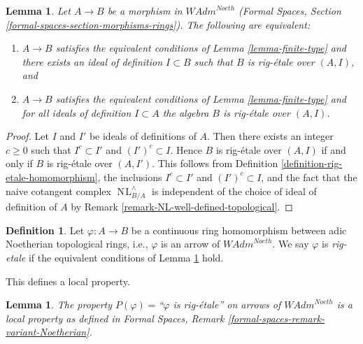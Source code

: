 \documentclass{stacks-project}
\theoremstyle{plain}
\newtheorem{lemma}[subsection]{Lemma}
\theoremstyle{definition}
\newtheorem{definition}[subsection]{Definition}
\theoremstyle{remark}
\numberwithin{equation}{subsection}
\def\NL{\mathop{N\!L}\nolimits}
\begin{document}
\begin{lemma}
\label{lemma-rig-etale-continuous}
Let $A \to B$ be a morphism in $\textit{WAdm}^{Noeth}$
(Formal Spaces, Section \ref{formal-spaces-section-morphisms-rings}).
The following are equivalent:
\begin{enumerate}
\item[(a)] $A \to B$ satisfies the equivalent conditions of
Lemma \ref{lemma-finite-type} and there exists an ideal of definition
$I \subset B$ such that $B$ is rig-\'etale over $(A, I)$, and
\item[(b)] $A \to B$ satisfies the equivalent conditions of
Lemma \ref{lemma-finite-type} and for all ideals of definition
$I \subset A$ the algebra $B$ is rig-\'etale over $(A, I)$.
\end{enumerate}
\end{lemma}

\begin{proof}
Let $I$ and $I'$ be ideals of definitions of $A$. Then there exists an
integer $c \geq 0$ such that $I^c \subset I'$ and $(I')^c \subset I$. Hence
$B$ is rig-\'etale over $(A, I)$ if and only if
$B$ is rig-\'etale over $(A, I')$. This follows from
Definition \ref{definition-rig-etale-homomorphism},
the inclusions $I^c \subset I'$ and $(I')^c \subset I$, and
the fact that the naive cotangent complex $\NL_{B/A}^\wedge$
is independent of the choice of ideal of definition of $A$ by
Remark \ref{remark-NL-well-defined-topological}.
\end{proof}

\begin{definition}
\label{definition-rig-etale-continuous-homomorphism}
Let $\varphi : A \to B$ be a continuous ring homomorphism
between adic Noetherian topological rings, i.e., $\varphi$
is an arrow of $\textit{WAdm}^{Noeth}$. We say
$\varphi$ is {\it rig-etale} if the equivalent conditions
of Lemma \ref{lemma-rig-etale-continuous} hold.
\end{definition}

\noindent
This defines a local property.

\begin{lemma}
\label{lemma-rig-etale-axioms}
The property $P(\varphi)=$``$\varphi$ is rig-\'etale'' on arrows
of $\textit{WAdm}^{Noeth}$ is a local property as defined in
Formal Spaces, Remark \ref{formal-spaces-remark-variant-Noetherian}.
\end{lemma}
\end{document}
